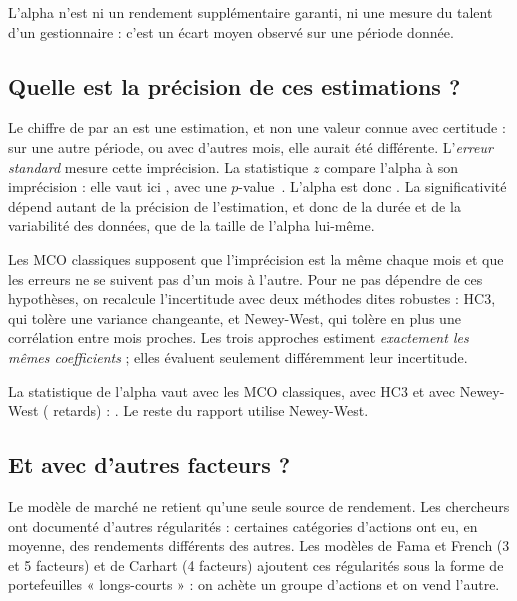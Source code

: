 \documentclass[11pt,a4paper]{article}
\begin{document}
L'alpha n'est ni un rendement supplémentaire garanti, ni une mesure du talent d'un gestionnaire : c'est un écart moyen observé sur une période donnée.

\subsection{Quelle est la précision de ces estimations ?}

Le chiffre de \AlphaA{} par an est une estimation, et non une valeur connue avec certitude : sur une autre période, ou avec d'autres mois, elle aurait été différente. L'\emph{erreur standard} mesure cette imprécision. La statistique $z$ compare l'alpha à son imprécision : elle vaut ici \AlphaZ{}, avec une \mbox{$p$-value \AlphaPEq}. L'alpha est donc \AlphaVerdict. La significativité dépend autant de la précision de l'estimation, et donc de la durée et de la variabilité des données, que de la taille de l'alpha lui-même.

Les MCO classiques supposent que l'imprécision est la même chaque mois et que les erreurs ne se suivent pas d'un mois à l'autre. Pour ne pas dépendre de ces hypothèses, on recalcule l'incertitude avec deux méthodes dites robustes : HC3, qui tolère une variance changeante, et Newey-West, qui tolère en plus une corrélation entre mois proches. Les trois approches estiment \emph{exactement les mêmes coefficients} ; elles évaluent seulement différemment leur incertitude.

\begin{table}[h]
  \centering\small
  
  \caption{Modèle de marché selon la méthode d'inférence. Les coefficients sont identiques ; seules les erreurs standards, et donc les statistiques et les intervalles, changent. Les méthodes robustes utilisent une approximation par la loi normale.}
\end{table}

La statistique de l'alpha vaut \AlphaTClassique{} avec les MCO classiques, \AlphaZHC{} avec HC3 et \AlphaZ{} avec Newey-West (\NWLags{} retards) : \InferenceConclusion. Le reste du rapport utilise Newey-West.

\subsection{Et avec d'autres facteurs ?}

Le modèle de marché ne retient qu'une seule source de rendement. Les chercheurs ont documenté d'autres régularités : certaines catégories d'actions ont eu, en moyenne, des rendements différents des autres. Les modèles de Fama et French (3 et 5 facteurs) et de Carhart (4 facteurs) ajoutent ces régularités sous la forme de portefeuilles « longs-courts » : on achète un groupe d'actions et on vend l'autre.
\end{document}
